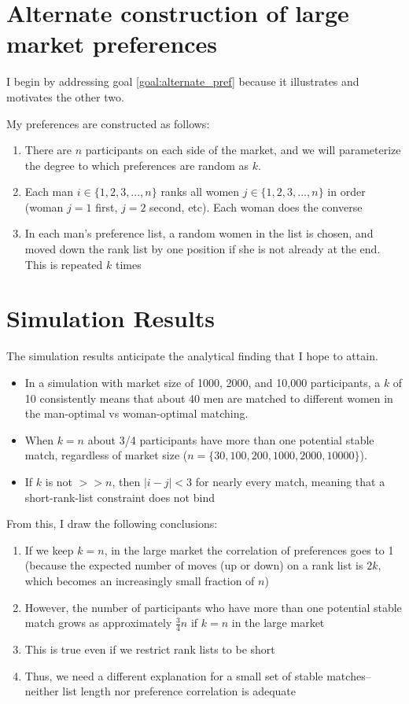 \documentclass[WP]{AEA}
\begin{document}
\section{Alternate construction of large market preferences}

I begin by addressing goal \ref*{goal:alternate_pref} because it illustrates and motivates the other two. 

My preferences are constructed as follows:
\begin{enumerate}
	\item There are $n$ participants on each side of the market, and we will parameterize the degree to which preferences are random as $k$.
	\item Each man $i \in \{1, 2, 3, ... , n\}$ ranks all women $j\in \{1, 2, 3, ... , n\}$ in order (woman $j=1$ first, $j=2$ second, etc). Each woman does the converse 
	\item In each man's preference list, a random women in the list is chosen, and moved down the rank list by one position if she is not already at the end.  This is repeated  $k$ times
\end{enumerate}




\section{Simulation Results}

The simulation results anticipate the analytical finding that I hope to attain. 

\begin{itemize}
	\item In a simulation with market size of  1000, 2000, and 10,000 participants,  a $k$ of 10 consistently means that about 40 men are matched to different women in the man-optimal vs woman-optimal matching. 
	\item When $k=n$    about 3/4 participants have more than one potential stable match, regardless of market size ($n= \{30, 100, 200, 1000, 2000, 10000\}$).
	\item If $k$ is not $>>n$, then $|i-j| < 3$ for nearly every match, meaning that a short-rank-list constraint does not bind
\end{itemize}
 

From this, I draw the following conclusions:
\begin{enumerate}
	\item If we keep $k=n$, in the large market the correlation of preferences goes to 1 (because the expected number of moves (up or down) on a rank list is $2k$, which becomes an increasingly small fraction of $n$)
	\item However, the number of participants who have more than one potential stable match grows as approximately $\frac{3}{4} n$ if $k=n$ in the large market
	\item This is true even if we restrict rank lists to be short
	\item Thus, we need a different explanation for a small set of stable matches--neither list length nor preference correlation is adequate
\end{enumerate}
\end{document}
